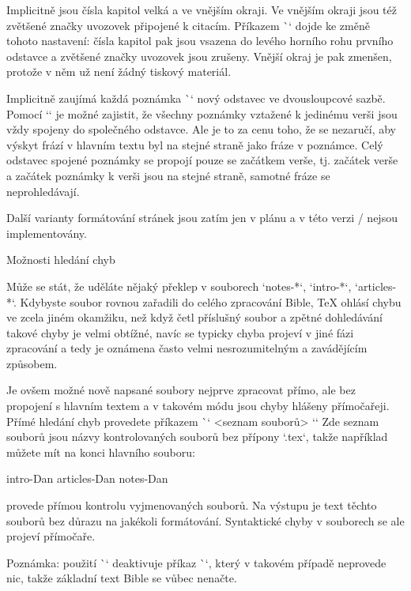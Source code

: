Implicitně jsou čísla kapitol velká a ve vnějším okraji. Ve vnějším okraji jsou též
zvětšené značky uvozovek připojené k citacím. Příkazem \`\normalchapnumbers`
dojde ke změně tohoto nastavení: čísla kapitol pak jsou vsazena do levého
horního rohu prvního odstavce a zvětšené značky uvozovek jsou zrušeny.
Vnější okraj je pak zmenšen, protože v něm už není žádný tiskový materiál.  

Implicitně zaujímá každá poznámka \`\Note` nový odstavec ve dvousloupcové
sazbě. Pomocí `\mergednotes` je možné zajistit, že všechny poznámky vztažené
k jedinému verši jsou vždy spojeny do společného odstavce. Ale je to za cenu
toho, že se nezaručí, aby výskyt frází v hlavním textu byl na stejné straně
jako fráze v poznámce. Celý odstavec spojené poznámky se propojí pouze se
začátkem verše, tj. začátek verše a začátek poznámky k verši jsou na stejné
straně, samotné fráze se neprohledávají.

Další varianty formátování stránek jsou zatím jen v plánu a v této verzi \OpBible/ nejsou
implementovány.


\sec Možnosti hledání chyb

Může se stát, že uděláte nějaký překlep v souborech `notes-*`, `intro-*`,
`articles-*`. Kdybyste soubor rovnou zařadili do celého zpracování Bible,
TeX ohlásí chybu ve zcela jiném okamžiku, než když četl příslušný soubor a
zpětné dohledávání takové chyby je velmi obtížné, navíc se typicky chyba
projeví v jiné fázi zpracování a tedy je oznámena často velmi
nesrozumitelným a zavádějícím způsobem.

Je ovšem možné nově napsané soubory nejprve zpracovat přímo, ale bez
propojení s hlavním textem a v takovém módu jsou chyby hlášeny přímočařeji.
Přímé hledání chyb provedete příkazem \`\checksyntax` <seznam souborů> `{}`
Zde seznam souborů jsou názvy kontrolovaných souborů bez přípony `.tex`,
takže například můžete mít na konci hlavního souboru:

\begtt
\checksyntax intro-Dan articles-Dan notes-Dan {}
\endtt

provede přímou kontrolu vyjmenovaných souborů. Na výstupu je text těchto
souborů bez důrazu na jakékoli formátování. Syntaktické chyby v souborech se
ale projeví přímočaře.

Poznámka: použití \`\checksyntax` deaktivuje příkaz \`\processbooks`, který v
takovém případě neprovede nic, takže základní text Bible se vůbec nenačte.



